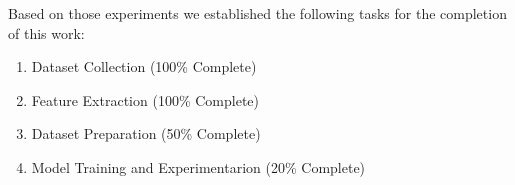 Based on those experiments we established the following tasks for the completion of this work:

\begin{enumerate}[start=0,label={(\bfseries T\arabic*):}]
\item Dataset Collection (100\% Complete)
\item Feature Extraction (100\% Complete)
\item Dataset Preparation (50\% Complete)
\item Model Training and Experimentarion (20\% Complete)
\end{enumerate}